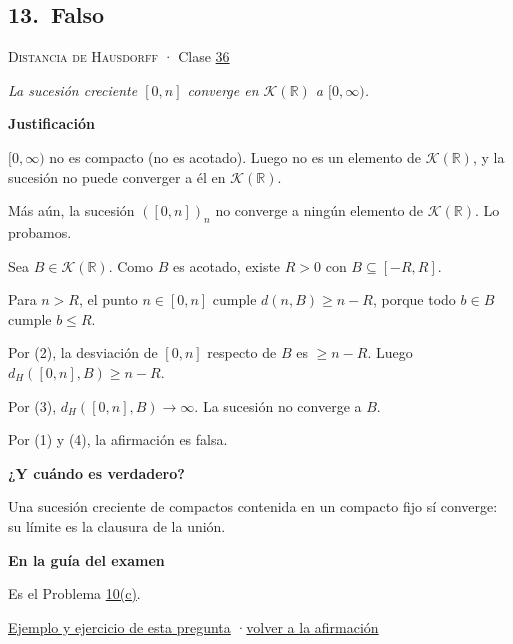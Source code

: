 \documentclass[11pt,a4paper]{article}
\newcommand{\R}{\mathbb{R}}\newcommand{\N}{\mathbb{N}}\newcommand{\Q}{\mathbb{Q}}
\newcommand{\bloque}[1]{\par\smallskip\noindent\textbf{\color{acento}#1}\par}
\begin{document}
\subsection*{\hypertarget{r-13}{}13.\ \textcolor{bad}{Falso}}
{\small \textsc{Distancia de Hausdorff} · Clase \href{https://decostruttivismo.github.io/MAT2514-repaso/pdf/MAT2514_apuntes_completos.pdf\#nameddest=section.36}{36}}\par
\emph{La sucesión creciente $[0,n]$ converge en $\mathcal K(\R)$ a $[0,\infty)$.}
\bloque{Justificación}
\begin{pasos}
\item[(1)] $[0,\infty)$ no es compacto (no es acotado). Luego no es un elemento de $\mathcal K(\R)$, y la sucesión no puede converger a él en $\mathcal K(\R)$.
\item[] Más aún, la sucesión $([0,n])_n$ no converge a ningún elemento de $\mathcal K(\R)$. Lo probamos.
\item[] Sea $B\in\mathcal K(\R)$. Como $B$ es acotado, existe $R\gt 0$ con $B\subseteq[-R,R]$.
\item[(2)] Para $n\gt R$, el punto $n\in[0,n]$ cumple $d(n,B)\ge n-R$, porque todo $b\in B$ cumple $b\le R$.
\item[(3)] Por (2), la desviación de $[0,n]$ respecto de $B$ es $\ge n-R$. Luego $d_H([0,n],B)\ge n-R$.
\item[(4)] Por (3), $d_H([0,n],B)\to\infty$. La sucesión no converge a $B$.
\item[] Por (1) y (4), la afirmación es falsa.
\end{pasos}
\bloque{¿Y cuándo es verdadero?}
\begin{pasos}
\item[] Una sucesión creciente de compactos contenida en un compacto fijo sí converge: su límite es la clausura de la unión.
\end{pasos}
\bloque{En la guía del examen}
\begin{pasos}
\item[] Es el Problema \hyperlink{prob-10}{10(c)}.
\end{pasos}
\par{}
\par{\small \hyperlink{e-13}{Ejemplo y ejercicio de esta pregunta} \quad·\quad \hyperlink{q-13}{volver a la afirmación}}
\end{document}
